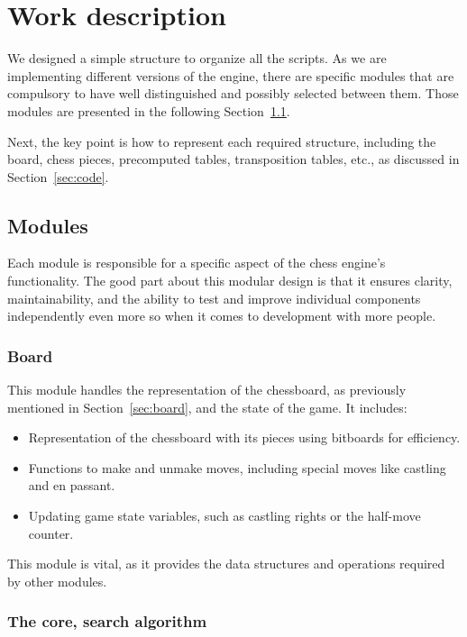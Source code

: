 \chapter{Work description}
\label{cap:descripcionTrabajo}

We designed a simple structure to organize all the scripts. As we are implementing different versions of the engine, there are specific modules that are compulsory to have well distinguished and possibly selected between them. Those modules are presented in the following Section~\ref{sec:modules}.

\vspace{1em}

\noindent Next, the key point is how to represent each required structure, including the board, chess pieces, precomputed tables, transposition tables, etc., as discussed in Section~\ref{sec:code}.

\section{Modules}
\label{sec:modules}

Each module is responsible for a specific aspect of the chess engine's functionality. The good part about this modular design is that it ensures clarity, maintainability, and the ability to test and improve individual components independently even more so when it comes to development with more people.

\subsection{Board}

\noindent This module handles the representation of the chessboard, as previously mentioned in Section~\ref{sec:board}, and the state of the game. It includes:
\begin{itemize}
    \item Representation of the chessboard with its pieces using bitboards for efficiency.
    \item Functions to make and unmake moves, including special moves like castling and en passant.
    \item Updating game state variables, such as castling rights or the half-move counter.
\end{itemize}

\noindent This module is vital, as it provides the data structures and operations required by other modules.

\subsection{The core, search algorithm}

